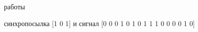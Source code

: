 \documentclass[a4paper,12pt]{article}
\begin{document}
{ работы}
\begin{enumerate}
{ синхропосылка [1 0 1] и сигнал [0 0 0 1 0 1 0 1 1 1 0 0 0 0 1 0]
\\}


\end{enumerate}
\end{document}
